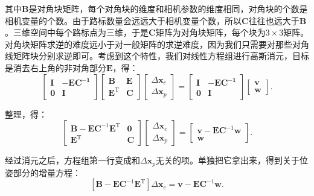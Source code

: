 其中$\bm{B}$是对角块矩阵，每个对角块的维度和相机参数的维度相同，对角块的个数是相机变量的个数。由于路标数量会远远大于相机变量个数，所以$\bm{C}$往往也远大于$\bm{B}$。三维空间中每个路标点为三维，于是$\bm{C}$矩阵为对角块矩阵，每个块为$3 \times 3$矩阵。对角块矩阵求逆的难度远小于对一般矩阵的求逆难度，因为我们只需要对那些对角线矩阵块分别求逆即可。考虑到这个特性，我们对线性方程组进行高斯消元，目标是消去右上角的非对角部分$\bm{E}$，得：
\begin{equation}\label{eq:guasselimination}
\left[ \begin{matrix}
\bm{I}   &    -\bm{EC^{-1}} \\
\bm{0}	 &	  \bm{I}
\end{matrix}\right]
\left[ \begin{matrix}
\bm{B}   &   \bm{E} \\
\bm{E^\mathrm{T}} &   \bm{C}
\end{matrix}\right] 
\left[ \begin{array}{l}
\Delta \bm{x}_c \\
\Delta \bm{x}_p 
\end{array} \right] = 
\left[ \begin{matrix}
\bm{I}   &    -\bm{EC^{-1}}  \\
\bm{0}	 &	  \bm{I}
\end{matrix}
\right]
\left[ \begin{array}{l}
\bm{v} \\
\bm{w} 
\end{array} \right]  .
\end{equation}

整理，得：
\begin{equation}
\left[ \begin{matrix}
\bm{B} - \bm{E}\bm{C}^{-1}\bm{E}^\mathrm{T}	& 	\bm{0} \\
\bm{E}^\mathrm{T}							& 	\bm{C}
\end{matrix} \right]
\left[ \begin{array}{l}
\Delta \bm{x}_c \\
\Delta \bm{x}_p 
\end{array} \right] = 
\left[\begin{array}{l}
\bm{v} - \bm{E}\bm{C}^{-1}\bm{w}  \\
\bm{w}
\end{array}\right].
\end{equation}

经过消元之后，方程组第一行变成和$\Delta \bm{x}_p$无关的项。单独把它拿出来，得到关于位姿部分的增量方程：
\begin{equation}\label{eq:marginalization}
\left[ 
\bm{B} - \bm{E}\bm{C}^{-1}\bm{E}^\mathrm{T}
\right]
\Delta \bm{x}_c  = 
\bm{v} - \bm{E}\bm{C}^{-1}\bm{w} .
\end{equation}

